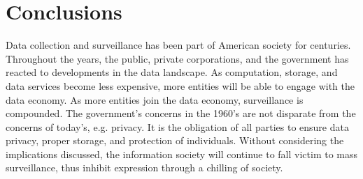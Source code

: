 \section{Conclusions}
Data collection and surveillance has been part of American
society for centuries. Throughout the years, the public,
private corporations, and the government has reacted to
developments in the data landscape. As computation, storage,
and data services become less expensive, more entities will
be able to engage with the data economy. As more entities join
the data economy, surveillance is compounded. The government's
concerns in the 1960's are not disparate from the concerns of
today's, e.g. privacy. It is the obligation of all parties
to ensure data privacy, proper storage, and protection of
individuals. Without considering the implications discussed,
the information society will continue to fall victim to mass
surveillance, thus inhibit expression through a chilling of
society.
